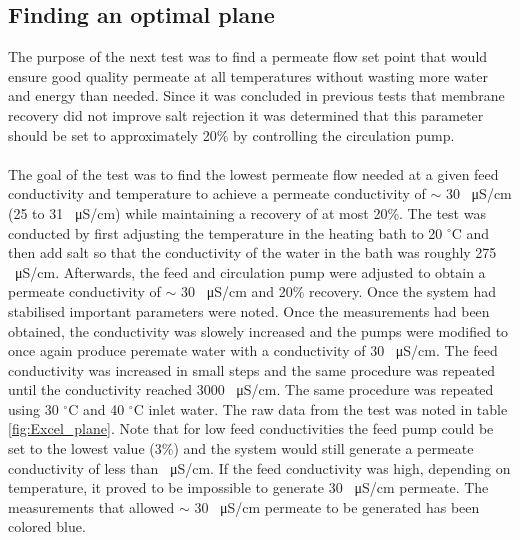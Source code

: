 \subsection{Finding an optimal plane}

The purpose of the next test was to find a permeate flow set point that would ensure good quality permeate at all temperatures without wasting more water and energy than needed. Since it was concluded in previous tests that membrane recovery did not improve salt rejection it was determined that this parameter should be set to approximately 20\% by controlling the circulation pump. \\
\\
The goal of the test was to find the lowest permeate flow needed at a given feed conductivity and temperature to achieve a permeate conductivity of  $\sim$ 30 \SI{}{\micro\siemens}/cm (25 to 31 \SI{}{\micro\siemens}/cm) while maintaining a recovery of at most 20\%. The test was conducted by first adjusting the temperature in the heating bath to 20 $^{\circ}$C and then add salt so that the conductivity of the water in the bath was roughly 275 \SI{}{\micro\siemens}/cm. Afterwards, the feed and circulation pump were adjusted to obtain a  permeate conductivity of  $\sim$ 30 \SI{}{\micro\siemens}/cm and 20\% recovery. Once the system had stabilised important parameters were noted. Once the measurements had been obtained, the conductivity was slowely increased and the pumps were modified to once again produce peremate water with a conductivity of 30 \SI{}{\micro\siemens}/cm. The feed conductivity was increased in small steps and the same procedure was repeated until the conductivity reached 3000 \SI{}{\micro\siemens}/cm. The same procedure was repeated using 30 $^{\circ}$C and 40 $^{\circ}$C inlet water. The raw data from the test was noted in table \ref{fig:Excel_plane}. Note that for low feed conductivities the feed pump could be set to the lowest value (3\%) and the system would still generate a permeate conductivity of less than \SI{}{\micro\siemens}/cm. If the feed conductivity was high, depending on temperature, it proved to be impossible to generate 30 \SI{}{\micro\siemens}/cm permeate. The measurements that allowed  $\sim$ 30 \SI{}{\micro\siemens}/cm permeate to be generated has been colored blue.

